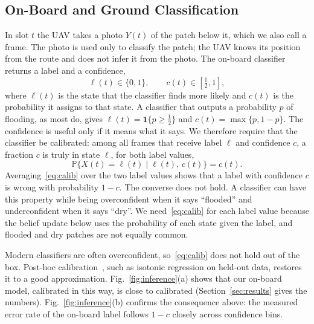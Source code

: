 \documentclass[5p,twocolumn]{elsarticle}
\theoremstyle{remark}
\newcommand{\Prob}{\mathbb{P}}
\newcommand{\ind}[1]{\mathbf{1}\{#1\}}
\newcommand{\lab}{\ell}
\begin{document}
\subsection{On-Board and Ground Classification}
In slot $t$ the UAV takes a photo $Y(t)$ of the patch below it, which we also call a frame. The photo is used only to classify the patch; the UAV knows its position from the route and does not infer it from the photo. The on-board classifier returns a label and a confidence,
\begin{equation}\label{eq:label}
\lab(t)\in\{0,1\},\qquad c(t)\in[\tfrac12,1],
\end{equation}
where $\lab(t)$ is the state that the classifier finds more likely and $c(t)$ is the probability it assigns to that state. A classifier that outputs a probability $p$ of flooding, as most do, gives $\lab(t)=\ind{p\ge\frac12}$ and $c(t)=\max\{p,1-p\}$. The confidence is useful only if it means what it says. We therefore require that the classifier be calibrated: among all frames that receive label $\lab$ and confidence $c$, a fraction $c$ is truly in state $\lab$, for both label values,
\begin{equation}\label{eq:calib}
\Prob\big\{X(t)=\lab(t)\mid\lab(t),\,c(t)\big\}=c(t).
\end{equation}
Averaging~\eqref{eq:calib} over the two label values shows that a label with confidence $c$ is wrong with probability $1-c$. The converse does not hold. A classifier can have this property while being overconfident when it says ``flooded'' and underconfident when it says ``dry''. We need~\eqref{eq:calib} for each label value because the belief update below uses the probability of each state given the label, and flooded and dry patches are not equally common.

Modern classifiers are often overconfident, so~\eqref{eq:calib} does not hold out of the box. Post-hoc calibration~\cite{guo2017calibration}, such as isotonic regression on held-out data, restores it to a good approximation. Fig.~\ref{fig:inference}(a) shows that our on-board model, calibrated in this way, is close to calibrated (Section~\ref{sec:results} gives the numbers). Fig.~\ref{fig:inference}(b) confirms the consequence above: the measured error rate of the on-board label follows $1-c$ closely across confidence bins.
\end{document}
